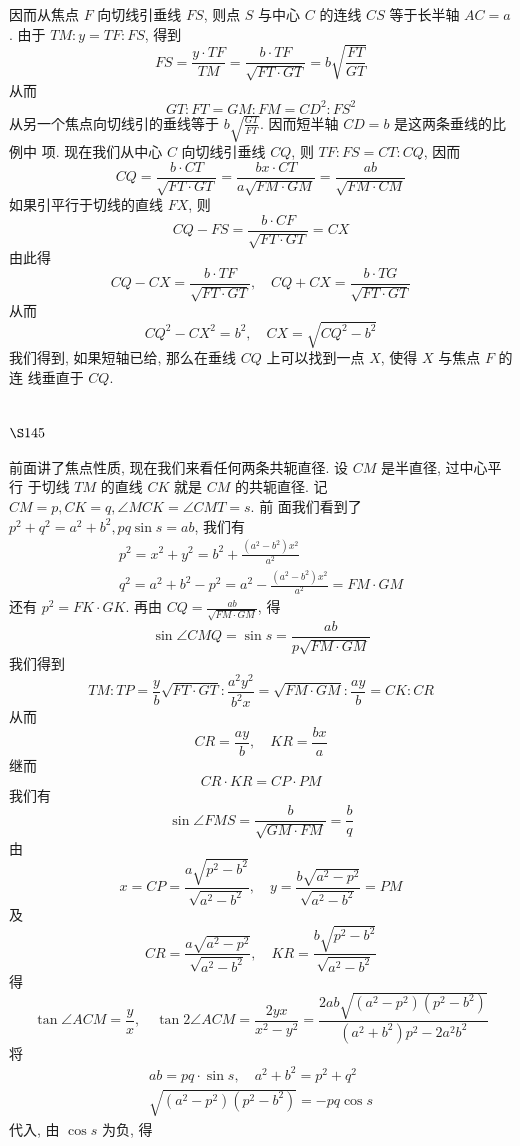 因而从焦点 $F$ 向切线引垂线 $F S$, 则点 $S$ 与中心 $C$ 的连线 $C S$ 等于长半轴 $A C=a$. 由于 $T M: y=T F: F S$, 得到
\[
F S=\frac{y \cdot T F}{T M}=\frac{b \cdot T F}{\sqrt{F T \cdot G T}}=b \sqrt{\frac{F T}{G T}}
\]
从而
\[
G T: F T=G M: F M=C D^{2}: F S^{2}
\]
从另一个焦点向切线引的垂线等于 $b \sqrt{\frac{G T}{F T}}$. 因而短半轴 $C D=b$ 是这两条垂线的比例中 项. 现在我们从中心 $C$ 向切线引垂线 $C Q$, 则 $T F: F S=C T: C Q$, 因而
\[
C Q=\frac{b \cdot C T}{\sqrt{F T \cdot G T}}=\frac{b x \cdot C T}{a \sqrt{F M \cdot G M}}=\frac{a b}{\sqrt{F M \cdot C M}}
\]
如果引平行于切线的直线 $F X$, 则
\[
C Q-F S=\frac{b \cdot C F}{\sqrt{F T \cdot G T}}=C X
\]
由此得
\[
C Q-C X=\frac{b \cdot T F}{\sqrt{F T \cdot G T}}, \quad C Q+C X=\frac{b \cdot T G}{\sqrt{F T \cdot G T}}
\]
从而
\[
C Q^{2}-C X^{2}=b^{2}, \quad C X=\sqrt{C Q^{2}-b^{2}}
\]
我们得到, 如果短轴已给, 那么在垂线 $C Q$ 上可以找到一点 $X$, 使得 $X$ 与焦点 $F$ 的连 线垂直于 $C Q$. 

\section{$\S 145$}

前面讲了焦点性质, 现在我们来看任何两条共轭直径. 设 $C M$ 是半直径, 过中心平行 于切线 $T M$ 的直线 $C K$ 就是 $C M$ 的共轭直径. 记 $C M=p, C K=q, \angle M C K=\angle C M T=s$. 前 面我们看到了 $p^{2}+q^{2}=a^{2}+b^{2}, p q \sin s=a b$, 我们有
\[
\begin{gathered}
p^{2}=x^{2}+y^{2}=b^{2}+\frac{\left(a^{2}-b^{2}\right) x^{2}}{a^{2}} \\
q^{2}=a^{2}+b^{2}-p^{2}=a^{2}-\frac{\left(a^{2}-b^{2}\right) x^{2}}{a^{2}}=F M \cdot G M
\end{gathered}
\]
还有 $p^{2}=F K \cdot G K$. 再由 $C Q=\frac{a b}{\sqrt{F M \cdot G M}}$, 得
\[
\sin \angle C M Q=\sin s=\frac{a b}{p \sqrt{F M \cdot G M}}
\]
我们得到
\[
T M: T P=\frac{y}{b} \sqrt{F T \cdot G T}: \frac{a^{2} y^{2}}{b^{2} x}=\sqrt{F M \cdot G M}: \frac{a y}{b}=C K: C R
\]
从而
\[
C R=\frac{a y}{b}, \quad K R=\frac{b x}{a}
\]
继而
\[
C R \cdot K R=C P \cdot P M
\]
我们有
\[
\sin \angle F M S=\frac{b}{\sqrt{G M \cdot F M}}=\frac{b}{q}
\]
由
\[
x=C P=\frac{a \sqrt{p^{2}-b^{2}}}{\sqrt{a^{2}-b^{2}}}, \quad y=\frac{b \sqrt{a^{2}-p^{2}}}{\sqrt{a^{2}-b^{2}}}=P M
\]
及
\[
C R=\frac{a \sqrt{a^{2}-p^{2}}}{\sqrt{a^{2}-b^{2}}}, \quad K R=\frac{b \sqrt{p^{2}-b^{2}}}{\sqrt{a^{2}-b^{2}}}
\]
得
\[
\tan \angle A C M=\frac{y}{x}, \quad \tan 2 \angle A C M=\frac{2 y x}{x^{2}-y^{2}}=\frac{2 a b \sqrt{\left(a^{2}-p^{2}\right)\left(p^{2}-b^{2}\right)}}{\left(a^{2}+b^{2}\right) p^{2}-2 a^{2} b^{2}}
\]
将
\[
\begin{gathered}
a b=p q \cdot \sin s, \quad a^{2}+b^{2}=p^{2}+q^{2} \\
\sqrt{\left(a^{2}-p^{2}\right)\left(p^{2}-b^{2}\right)}=-p q \cos s
\end{gathered}
\]
代入, 由 $\cos s$ 为负, 得

